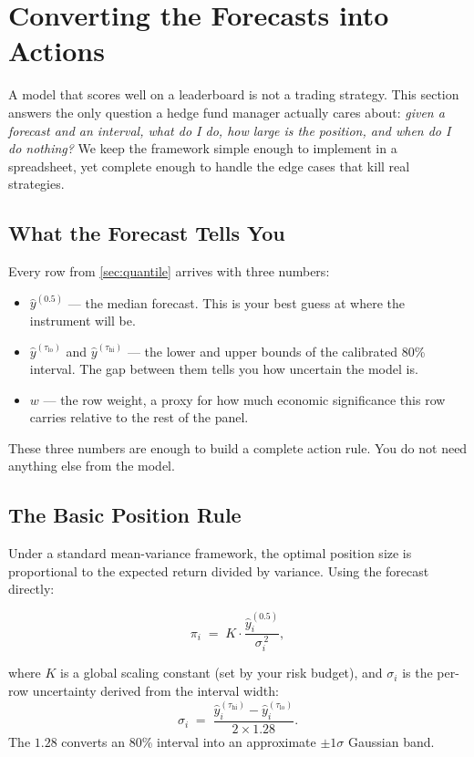 \section{Converting the Forecasts into Actions}
\label{sec:actions}

A model that scores well on a leaderboard is not a trading strategy. This section answers the only question a hedge fund manager actually cares about: \emph{given a forecast and an interval, what do I do, how large is the position, and when do I do nothing?} We keep the framework simple enough to implement in a spreadsheet, yet complete enough to handle the edge cases that kill real strategies.

\subsection{What the Forecast Tells You}

Every row from \cref{sec:quantile} arrives with three numbers:
\begin{itemize}
  \item $\hat{y}^{(0.5)}$ --- the median forecast. This is your best guess at where the instrument will be.
  \item $\hat{y}^{(\tau_{\text{lo}})}$ and $\hat{y}^{(\tau_{\text{hi}})}$ --- the lower and upper bounds of the calibrated 80\% interval. The gap between them tells you how uncertain the model is.
  \item $w$ --- the row weight, a proxy for how much economic significance this row carries relative to the rest of the panel.
\end{itemize}

These three numbers are enough to build a complete action rule. You do not need anything else from the model.

\subsection{The Basic Position Rule}

Under a standard mean-variance framework, the optimal position size is proportional to the expected return divided by variance. Using the forecast directly:

\begin{equation}
  \pi_i \;=\; K \cdot \frac{\hat{y}_i^{(0.5)}}{\sigma_i^{\,2}},
  \label{eq:position}
\end{equation}

where $K$ is a global scaling constant (set by your risk budget), and $\sigma_i$ is the per-row uncertainty derived from the interval width:
\[
  \sigma_i \;=\; \frac{\hat{y}_i^{(\tau_{\text{hi}})} - \hat{y}_i^{(\tau_{\text{lo}})}}{2 \times 1.28}.
\]
The $1.28$ converts an 80\% interval into an approximate $\pm 1\sigma$ Gaussian band.

